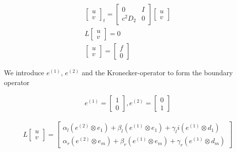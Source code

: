 \documentclass[a4paper]{article}
\begin{document}
\begin{equation}
	\begin{aligned}
		\begin{bmatrix} u \\ v \end{bmatrix}_t = \begin{bmatrix} 0& I \\ c^2D_2& 0 \end{bmatrix}\begin{bmatrix} u \\ v \end{bmatrix} \\
		L\begin{bmatrix} u \\ v \end{bmatrix} = 0 \\
		\begin{bmatrix} u \\ v \end{bmatrix} = \begin{bmatrix} f \\ 0 \end{bmatrix} 
	\end{aligned}
\end{equation}

We introduce $e^{(1)}$, $e^{(2)}$ and the Kronecker-operator to form the boundary operator

\begin{equation}
	\begin{aligned}
		e^{(1)}=\begin{bmatrix} 1 \\ 0 \end{bmatrix}, e^{(2)}=\begin{bmatrix} 0 \\ 1 \end{bmatrix} 
	\end{aligned}
\end{equation}

\begin{equation}
	\begin{aligned}
		L \begin{bmatrix} u \\ v \end{bmatrix}  = \begin{bmatrix} \alpha_l(e^{(2)} \otimes e_1 ) + \beta_l(e^{(1)} \otimes e_1 ) + \gamma_li(e^{(1)} \otimes d_1 ) \\ \alpha_r(e^{(2)}\otimes e_m) + \beta_r(e^{(1)} \otimes e_m ) + \gamma_r (e^{(1)} \otimes d_m) \end{bmatrix} 
	\end{aligned}
\end{equation}
\end{document}
